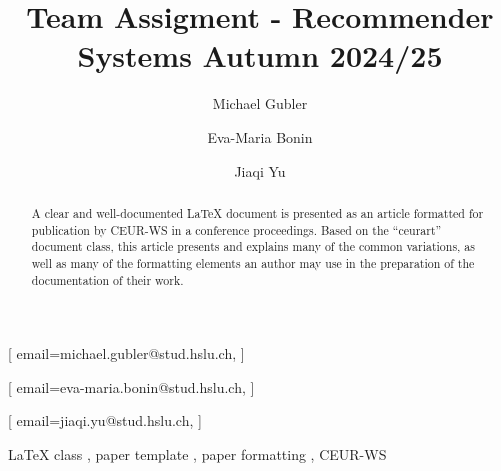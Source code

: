 \documentclass[
]{ceurart}
\begin{document}


\title{Team Assigment - Recommender Systems Autumn 2024/25}

\tnotemark[1]

\author[1]{Michael Gubler}[%
email=michael.gubler@stud.hslu.ch,
]
\author[1]{Eva-Maria Bonin}[%
email=eva-maria.bonin@stud.hslu.ch,
]
\author[1]{Jiaqi Yu}[%
email=jiaqi.yu@stud.hslu.ch,
]

\fnmark[1]
\address[1]{HSLU}


\begin{abstract}
  A clear and well-documented \LaTeX{} document is presented as an
  article formatted for publication by CEUR-WS in a conference
  proceedings. Based on the ``ceurart'' document class, this article
  presents and explains many of the common variations, as well as many
  of the formatting elements an author may use in the preparation of
  the documentation of their work.
\end{abstract}

\begin{keywords}
  LaTeX class \sep
  paper template \sep
  paper formatting \sep
  CEUR-WS
\end{keywords}

\maketitle
\end{document}
